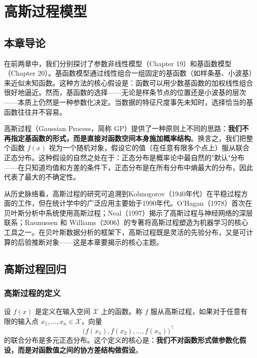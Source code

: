 
\chapter{高斯过程模型}

\section{本章导论}

在前两章中，我们分别探讨了参数非线性模型（Chapter 19）和基函数模型（Chapter 20）。基函数模型通过线性组合一组固定的基函数（如样条基、小波基）来近似未知函数。这种方法的核心假设是：函数可以用少数基函数的加权线性组合很好地逼近。然而，基函数的选择——无论是样条节点的位置还是小波基的层次——本质上仍然是一种参数化决定。当数据的特征尺度事先未知时，选择恰当的基函数往往并不容易。

高斯过程（Gaussian Process，简称 GP）提供了一种原则上不同的思路：\textbf{我们不再指定基函数的形式，而是直接对函数空间本身施加概率结构}。换言之，我们把整个函数 $f(x)$ 视为一个随机对象，假设它的值（在任意有限多个点上）服从联合正态分布。这种假设的自然之处在于：正态分布是概率论中最自然的"默认"分布——在只知道均值和方差的条件下，正态分布是在所有分布中熵最大的分布，因此代表了最大的不确定性。

从历史脉络看，高斯过程的研究可追溯到Kolmogorov（1940年代）在平稳过程方面的工作，但在统计学中的广泛应用主要始于1990年代。O'Hagan（1978）首次在贝叶斯分析中系统使用高斯过程；Neal（1997）揭示了高斯过程与神经网络的深层联系；Rasmussen 和 Williams（2006）的专著将高斯过程塑造为机器学习的核心工具之一。在贝叶斯数据分析的框架下，高斯过程既是灵活的先验分布，又是可计算的后验推断对象——这是本章要揭示的核心主题。

\section{高斯过程回归}

\subsection{高斯过程的定义}

设 $f(x)$ 是定义在输入空间 $\mathcal{X}$ 上的函数。称 $f$ 服从高斯过程，如果对于任意有限的输入点 $x_1, \ldots, x_n \in \mathcal{X}$，向量
\[
\bigl(f(x_1), f(x_2), \ldots, f(x_n)\bigr)^\top
\]
的联合分布是多元正态分布。这个定义的核心是：\textbf{我们不对函数形式做参数化假设，而是对函数值之间的协方差结构做假设}。


